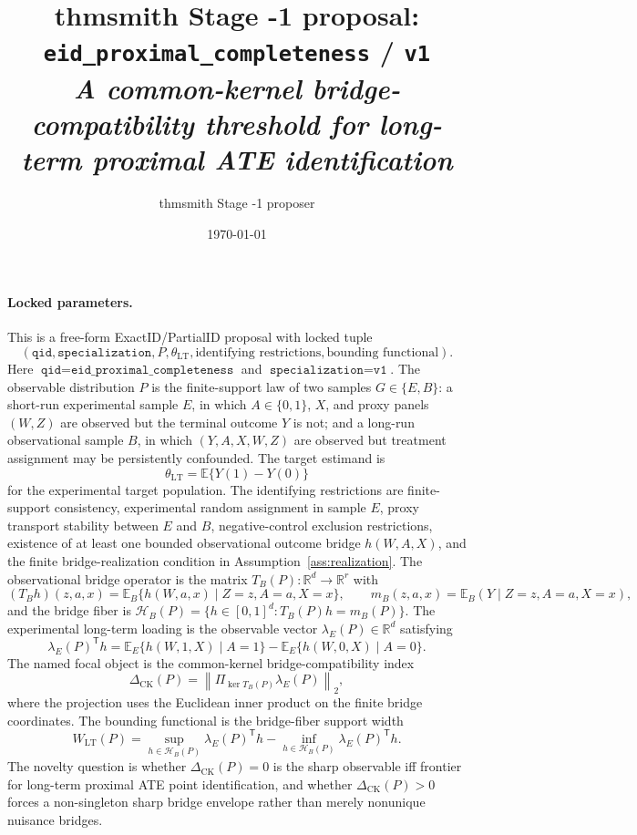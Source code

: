 \documentclass[11pt]{article}
\title{thmsmith Stage -1 proposal: \texttt{eid\_proximal\_completeness} / \texttt{v1}%
  \\ \large\textit{A common-kernel bridge-compatibility threshold for long-term proximal ATE identification}}
\author{thmsmith Stage -1 proposer}
\date{\today}
\newcommand{\E}{\mathbb{E}}
\newcommand{\transpose}{\mathsf{T}}
\newcommand{\calH}{\mathcal{H}}
\newcommand{\R}{\mathbb{R}}
\theoremstyle{definition}
\theoremstyle{plain}
\theoremstyle{remark}
\begin{document}
\maketitle


\paragraph{Locked parameters.}
This is a free-form ExactID/PartialID proposal with locked tuple
\[
(\texttt{qid},\texttt{specialization}, P, \theta_{\mathrm{LT}},
\text{identifying restrictions},\text{bounding functional}).
\]
Here \(\texttt{qid}=\texttt{eid\_proximal\_completeness}\) and
\(\texttt{specialization}=\texttt{v1}\).  The observable distribution \(P\)
is the finite-support law of two samples \(G\in\{E,B\}\): a short-run
experimental sample \(E\), in which \(A\in\{0,1\}\), \(X\), and proxy panels
\((W,Z)\) are observed but the terminal outcome \(Y\) is not; and a long-run
observational sample \(B\), in which \((Y,A,X,W,Z)\) are observed but
treatment assignment may be persistently confounded.  The target estimand is
\[
\theta_{\mathrm{LT}}=\E\{Y(1)-Y(0)\}
\]
for the experimental target population.  The identifying restrictions are
finite-support consistency, experimental random assignment in sample \(E\),
proxy transport stability between \(E\) and \(B\), negative-control exclusion
restrictions, existence of at least one bounded observational outcome bridge
\(h(W,A,X)\), and the finite bridge-realization condition in
Assumption~\ref{ass:realization}.  The observational bridge operator is the
matrix \(T_B(P):\R^d\to\R^r\) with
\[
(T_Bh)(z,a,x)=\E_B\{h(W,a,x)\mid Z=z,A=a,X=x\},
\qquad
m_B(z,a,x)=\E_B(Y\mid Z=z,A=a,X=x),
\]
and the bridge fiber is \(\calH_B(P)=\{h\in[0,1]^d:T_B(P)h=m_B(P)\}\).
The experimental long-term loading is the observable vector
\(\lambda_E(P)\in\R^d\) satisfying
\[
\lambda_E(P)^\transpose h
=\E_E\{h(W,1,X)\mid A=1\}-\E_E\{h(W,0,X)\mid A=0\}.
\]
The named focal object is the common-kernel bridge-compatibility index
\[
\Delta_{\mathrm{CK}}(P)=
\left\|\Pi_{\ker T_B(P)}\lambda_E(P)\right\|_2,
\]
where the projection uses the Euclidean inner product on the finite bridge
coordinates.  The bounding functional is the bridge-fiber support width
\[
W_{\mathrm{LT}}(P)
=\sup_{h\in\calH_B(P)}\lambda_E(P)^\transpose h
-\inf_{h\in\calH_B(P)}\lambda_E(P)^\transpose h.
\]
The novelty question is whether \(\Delta_{\mathrm{CK}}(P)=0\) is the sharp
observable iff frontier for long-term proximal ATE point identification, and
whether \(\Delta_{\mathrm{CK}}(P)>0\) forces a non-singleton sharp bridge
envelope rather than merely nonunique nuisance bridges.
\end{document}
